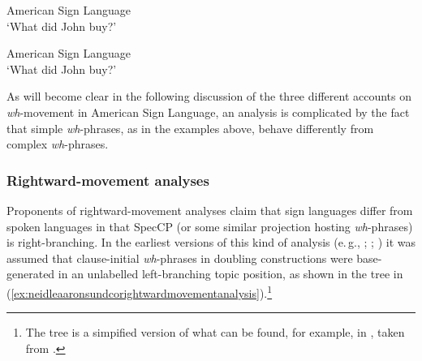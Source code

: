 \begin{exe}
\ex American Sign Language \\ 
%
\glt `What did John buy?' \label{ex:basicdatatwo} 
\end{exe}

\begin{exe}
\ex American Sign Language \\
%
\glt `What did John buy?' \label{ex:basicdatathree} 
\end{exe}

\noindent As will become clear in the following discussion of the three different accounts on \textit{wh}-movement in American Sign Language, an analysis is complicated by the fact that simple \textit{wh}-phrases, as in the examples above, behave differently from complex \textit{wh}-phrases.

\subsubsection{Rightward-movement analyses}
Proponents of rightward-movement analyses claim that sign languages differ from spoken languages in that SpecCP (or some similar projection hosting \textit{wh}-phrases) is right-branching. In the earliest versions of this kind of analysis (e.\,g., \citealt{aarons1992clausal}; \citealt{aarons1994aspects}; \citealt{neidle1998rightward}) it was assumed that clause-initial \textit{wh}-phrases in doubling constructions were base-generated in an unlabelled left-branching topic position, as shown in the tree in (\ref{ex:neidleaaronsundcorightwardmovementanalysis}).\footnote{ The tree is a simpified version of what can be found, for example, in \citet{neidle1994architecture}, taken from \citet[27]{petronio1997}.} %


